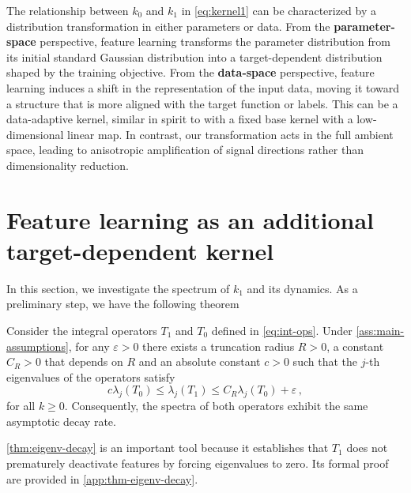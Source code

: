  The relationship between $k_0$ and $k_1$ in \cref{eq:kernel1} can be characterized by a distribution transformation in either parameters or data. From the {\bf parameter-space} perspective, feature learning transforms the parameter distribution from its initial standard Gaussian distribution into a target-dependent distribution shaped by the training objective.
From the {\bf data-space} perspective, feature learning induces a shift in the representation of the input data, moving it toward a structure that is more aligned with the target function or labels.
This can be a data-adaptive kernel, similar in spirit to \cite{follain2024enhanced,Huang2025} with a fixed base kernel with a low-dimensional linear map. 
In contrast, our transformation acts in the full ambient space, leading to anisotropic amplification of signal directions rather than dimensionality reduction.

\section{Feature learning as an additional target-dependent kernel}\label{sec:four}
In this section, we investigate the spectrum of $k_1$ and its dynamics. As a preliminary step, we have the following theorem

\begin{theorem}\label{thm:eigenv-decay}
    Consider the integral operators $T_1$ and $T_0$ defined in \cref{eq:int-ops}. Under \cref{ass:main-assumptions}, for any $\varepsilon > 0$ there exists a truncation radius $R>0$, a constant $C_R > 0$ that depends on $R$ and an absolute constant $c > 0$ such that the $j$-th eigenvalues of the operators satisfy
    \[
        c \lambda_j(T_0) \leq \lambda_j(T_1) \leq C_R \lambda_j(T_0) + \varepsilon\,,
    \]
    for all $k \geq 0$. Consequently, the spectra of both operators exhibit the same asymptotic decay rate.
\end{theorem}

\cref{thm:eigenv-decay} is an important tool because it establishes that $T_1$ does not prematurely deactivate features by forcing eigenvalues to zero. Its formal proof are provided in \cref{app:thm-eigenv-decay}.

